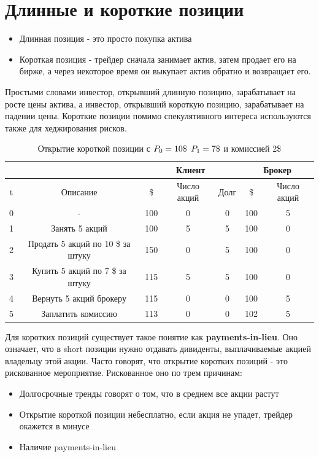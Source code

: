 \documentclass{article}
\begin{document}
\section{Длинные и короткие позиции}
\begin{itemize}
     \item Длинная позиция - это просто покупка актива
     \item Короткая позиция - трейдер сначала занимает актив, затем продает его на бирже, а через некоторое время он выкупает актив обратно и возвращает его.
\end{itemize}
Простыми словами инвестор, открывший длинную позицию, зарабатывает на росте цены актива, а инвестор, открывший короткую позицию, зарабатывает на падении цены.
Короткие позиции помимо спекулятивного интереса используются также для хеджирования рисков.



\begin{table}[h]
\caption{\label{tab:canonsummary} Открытие короткой позиции с $P_0=10\$\\$ $P_1=7\$\\$ и комиссией 2\$}
\begin{center}
\begin{tabular}{|c|c|c|c|c|c|c|}
\hline
\multicolumn{2}{|c|}{} & \multicolumn{3}{|c|}{Клиент} & \multicolumn{2}{|c|}{Брокер} \\
\hline
t & Описание & \$ & Число акций & Долг & \$ & Число акций\\
\hline
0 & - & 100 & 0 & 0 & 100 & 5\\
\hline
1 & Занять 5 акций & 100 & 5 & 5 & 100 & 0\\
\hline
2 & Продать 5 акций по 10 \$ за штуку & 150 & 0 & 5 & 100 & 0\\
\hline
3 & Купить 5 акций по 7 \$ за штуку & 115 & 5 & 5 & 100 & 0\\
\hline
4 & Вернуть 5 акций брокеру & 115 & 0 & 0 & 100 & 5\\
\hline
5 & Заплатить комиссию & 113 & 0 & 0 & 102 & 5\\
\hline
\end{tabular}
\end{center}
\end{table} 

 
Для коротких позиций существует такое понятие как \textbf{payments-in-lieu}. Оно означает, что в short позиции нужно отдавать дивиденты, выплачиваемые акцией владельцу этой акции. Часто говорят, что открытие коротких позиций - это рискованное мероприятие. Рискованное оно по трем причинам:
\begin{itemize}
    \item Долгосрочные тренды говорят о том, что в среднем все акции растут
    \item Открытие короткой позиции небесплатно, если акция не упадет, трейдер окажется в минусе
    \item Наличие payments-in-lieu
\end{itemize}
\end{document}

